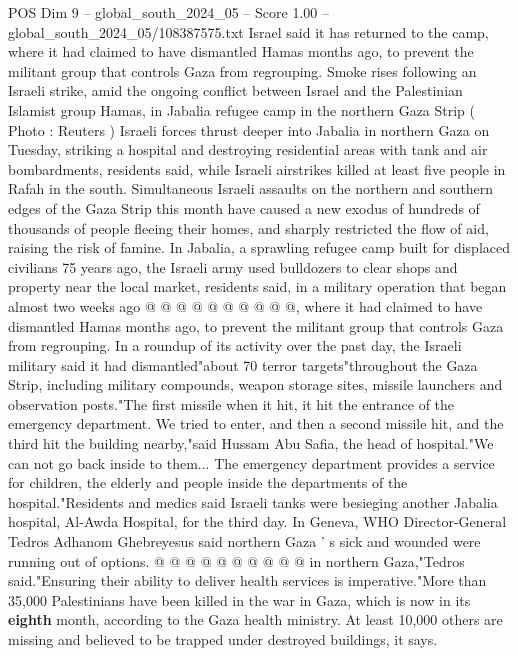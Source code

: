 \begin{textsample}{POS Dim 9 – global\_south\_2024\_05 – Score 1.00 – global\_south\_2024\_05/108387575.txt}  \label{ex:f9_pos_130}
Israel said it has returned to the camp, where it had claimed to have dismantled Hamas months ago, to prevent the militant group that controls Gaza from regrouping.
Smoke rises following an Israeli strike, amid the ongoing conflict between Israel and the Palestinian Islamist group Hamas, in Jabalia refugee camp in the northern Gaza Strip ( Photo : Reuters ) Israeli forces thrust deeper into Jabalia in northern Gaza on Tuesday, striking a hospital and destroying residential areas with tank and air bombardments, residents said, while Israeli airstrikes killed at least five people in Rafah in the south.
Simultaneous Israeli assaults on the northern and southern edges of the Gaza Strip this month have caused a new exodus of hundreds of thousands of people fleeing their homes, and sharply restricted the flow of aid, raising the risk of famine.
In Jabalia, a sprawling refugee camp built for displaced civilians 75 years ago, the Israeli army used bulldozers to clear shops and property near the local market, residents said, in a military operation that began almost two weeks ago @ @ @ @ @ @ @ @ @ @, where it had claimed to have dismantled Hamas months ago, to prevent the militant group that controls Gaza from regrouping.
In a roundup of its activity over the past day, the Israeli military said it had dismantled"about 70 terror targets"throughout the Gaza Strip, including military compounds, weapon storage sites, missile launchers and observation posts."The first missile when it hit, it hit the entrance of the emergency department.
We tried to enter, and then a second missile hit, and the third hit the building nearby,"said Hussam Abu Safia, the head of hospital."We can not go back inside to them...
The emergency department provides a service for children, the elderly and people inside the departments of the hospital."Residents and medics said Israeli tanks were besieging another Jabalia hospital, Al-Awda Hospital, for the third day.
In Geneva, WHO Director-General Tedros Adhanom Ghebreyesus said northern Gaza ' s sick and wounded were running out of options. @ @ @ @ @ @ @ @ @ @ in northern Gaza,"Tedros said."Ensuring their ability to deliver health services is imperative."More than 35,000 Palestinians have been killed in the war in Gaza, which is now in its \textbf{eighth} month, according to the Gaza health ministry.
At least 10,000 others are missing and believed to be trapped under destroyed buildings, it says.

\end{textsample}
